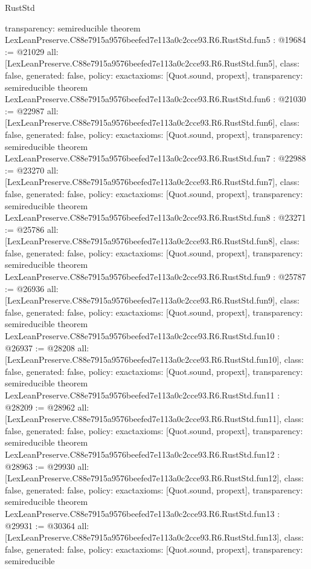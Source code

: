 \begin{lexlean}{RustStd}
\begin{coremodule}
{  transparency: semireducible
}
theorem LexLeanPreserve.C88e7915a9576beefed7e113a0c2cce93.R6.RustStd.fun5 : @19684 := @21029 {
  all: [LexLeanPreserve.C88e7915a9576beefed7e113a0c2cce93.R6.RustStd.fun5],
  class: false,
  generated: false,
  policy: exact{axioms: [Quot.sound, propext]},
  transparency: semireducible
}
theorem LexLeanPreserve.C88e7915a9576beefed7e113a0c2cce93.R6.RustStd.fun6 : @21030 := @22987 {
  all: [LexLeanPreserve.C88e7915a9576beefed7e113a0c2cce93.R6.RustStd.fun6],
  class: false,
  generated: false,
  policy: exact{axioms: [Quot.sound, propext]},
  transparency: semireducible
}
theorem LexLeanPreserve.C88e7915a9576beefed7e113a0c2cce93.R6.RustStd.fun7 : @22988 := @23270 {
  all: [LexLeanPreserve.C88e7915a9576beefed7e113a0c2cce93.R6.RustStd.fun7],
  class: false,
  generated: false,
  policy: exact{axioms: [Quot.sound, propext]},
  transparency: semireducible
}
theorem LexLeanPreserve.C88e7915a9576beefed7e113a0c2cce93.R6.RustStd.fun8 : @23271 := @25786 {
  all: [LexLeanPreserve.C88e7915a9576beefed7e113a0c2cce93.R6.RustStd.fun8],
  class: false,
  generated: false,
  policy: exact{axioms: [Quot.sound, propext]},
  transparency: semireducible
}
theorem LexLeanPreserve.C88e7915a9576beefed7e113a0c2cce93.R6.RustStd.fun9 : @25787 := @26936 {
  all: [LexLeanPreserve.C88e7915a9576beefed7e113a0c2cce93.R6.RustStd.fun9],
  class: false,
  generated: false,
  policy: exact{axioms: [Quot.sound, propext]},
  transparency: semireducible
}
theorem LexLeanPreserve.C88e7915a9576beefed7e113a0c2cce93.R6.RustStd.fun10 : @26937 := @28208 {
  all: [LexLeanPreserve.C88e7915a9576beefed7e113a0c2cce93.R6.RustStd.fun10],
  class: false,
  generated: false,
  policy: exact{axioms: [Quot.sound, propext]},
  transparency: semireducible
}
theorem LexLeanPreserve.C88e7915a9576beefed7e113a0c2cce93.R6.RustStd.fun11 : @28209 := @28962 {
  all: [LexLeanPreserve.C88e7915a9576beefed7e113a0c2cce93.R6.RustStd.fun11],
  class: false,
  generated: false,
  policy: exact{axioms: [Quot.sound, propext]},
  transparency: semireducible
}
theorem LexLeanPreserve.C88e7915a9576beefed7e113a0c2cce93.R6.RustStd.fun12 : @28963 := @29930 {
  all: [LexLeanPreserve.C88e7915a9576beefed7e113a0c2cce93.R6.RustStd.fun12],
  class: false,
  generated: false,
  policy: exact{axioms: [Quot.sound, propext]},
  transparency: semireducible
}
theorem LexLeanPreserve.C88e7915a9576beefed7e113a0c2cce93.R6.RustStd.fun13 : @29931 := @30364 {
  all: [LexLeanPreserve.C88e7915a9576beefed7e113a0c2cce93.R6.RustStd.fun13],
  class: false,
  generated: false,
  policy: exact{axioms: [Quot.sound, propext]},
  transparency: semireducible
}
\end{coremodule}
\end{lexlean}
